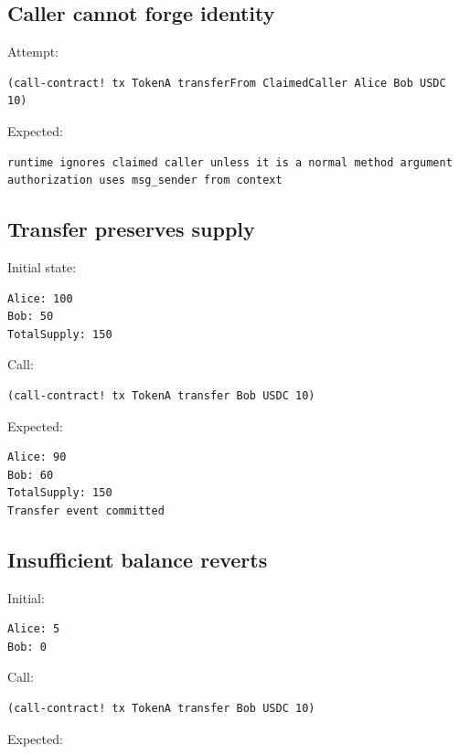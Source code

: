 \subsection{Caller cannot forge identity}

Attempt:

\begin{lstlisting}
(call-contract! tx TokenA transferFrom ClaimedCaller Alice Bob USDC 10)
\end{lstlisting}

Expected:

\begin{lstlisting}
runtime ignores claimed caller unless it is a normal method argument
authorization uses msg_sender from context
\end{lstlisting}

\subsection{Transfer preserves supply}

Initial state:

\begin{lstlisting}
Alice: 100
Bob: 50
TotalSupply: 150
\end{lstlisting}

Call:

\begin{lstlisting}
(call-contract! tx TokenA transfer Bob USDC 10)
\end{lstlisting}

Expected:

\begin{lstlisting}
Alice: 90
Bob: 60
TotalSupply: 150
Transfer event committed
\end{lstlisting}

\subsection{Insufficient balance reverts}

Initial:

\begin{lstlisting}
Alice: 5
Bob: 0
\end{lstlisting}

Call:

\begin{lstlisting}
(call-contract! tx TokenA transfer Bob USDC 10)
\end{lstlisting}

Expected:

